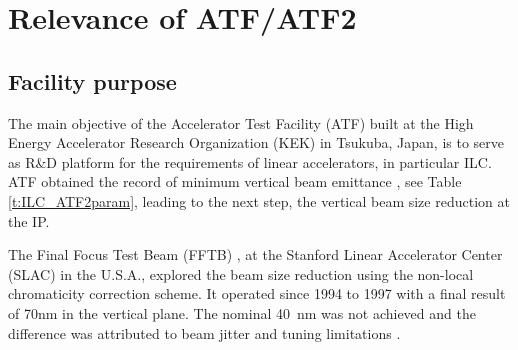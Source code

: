 \chapter{Relevance of ATF/ATF2}\label{s:ATF2}

\section{Facility purpose}
The main objective of the Accelerator Test Facility (ATF) built at the High Energy Accelerator Research Organization (KEK) in Tsukuba, Japan, is to serve as R\&D platform for the requirements of linear accelerators, in particular ILC. ATF obtained the record of minimum vertical beam emittance \cite{Kubo:2001ps,PhysRevLett.92.054802}, see Table \ref{t:ILC_ATF2param}, leading to the next step, the vertical beam size reduction at the IP.\par
The Final Focus Test Beam (FFTB) \cite{Berndt:1991ug}, at the Stanford Linear Accelerator Center (SLAC) in the  U.S.A., explored the beam size reduction using the non-local chromaticity correction scheme. It operated since 1994 to 1997 with a final result of 70nm in the vertical plane. The nominal 40~nm was not achieved and the difference was attributed to beam jitter and tuning limitations \cite{Araki1}.\par
